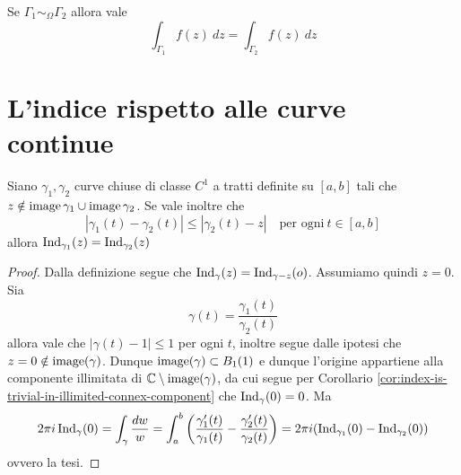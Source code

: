 \begin{corollary}
  Se $\Gamma_1 \sim_\Omega \Gamma_2$ allora vale
  \begin{equation*}
    \int_{\Gamma_1}f(z) \ dz = \int_{\Gamma_2 } f(z)\ dz
  \end{equation*}
  \label{cor:uguaglianza-catene-per-integrali}
\end{corollary}

\section{L'indice rispetto alle curve continue}

\begin{lemma}
    Siano $\gamma_1, \gamma_2$ curve chiuse di classe $C^1$ a tratti definite su
    $\left[ a,b \right]$ tali che $z \notin \operatorname{image}{\gamma_1} \cup
    \operatorname{image}{\gamma_2}$. Se vale inoltre che 
    \begin{equation*}
        |\gamma_1(t) - \gamma_2(t)| \le |\gamma_2(t) -z| \quad \text{per
        ogni}\ t \in \left[ a,b \right]
    \end{equation*}
    allora $\operatorname{Ind}_{\gamma_1}(z)
    = \operatorname{Ind}_{\gamma_2}(z)$
    \label{lem:stesso-indice-curve-vicine-in-punto}
\end{lemma}
\begin{proof}
 Dalla definizione segue che $\operatorname{Ind}_\gamma(z)
 = \operatorname{Ind}_{\gamma - z}(o)$. %
 Assumiamo quindi $z = 0$. Sia 
 \begin{equation*}
   \gamma(t) = \frac{\gamma_1(t)}{\gamma_2(t)}
 \end{equation*}
 allora vale che $|\gamma(t) - 1| \le 1$ per ogni $t$, inoltre segue dalle
 ipotesi che $z=0 \notin \operatorname{image}(\gamma)$. Dunque $\operatorname{image}(\gamma) \subset
 B_{1}(1)$ e dunque l'origine appartiene alla componente illimitata di $\mathbb{C}
 \setminus \operatorname{image}(\gamma)$, da cui segue per Corollario
 \ref{cor:index-is-trivial-in-illimited-connex-component} che
 $\operatorname{Ind}_\gamma(0) = 0$. Ma 
 \begin{equation*}
   2\pi i \operatorname{Ind}_\gamma(0) = \int_\gamma \frac{dw}{w} = \int_a^b
   \left( \frac{\gamma'_1(t)}{\gamma_1(t)}
   - \frac{\gamma'_2(t)}{\gamma_2(t)}\right) = 2\pi
   i (\operatorname{Ind}_{\gamma_1}(0) - \operatorname{Ind}_{\gamma_2}(0))
 \end{equation*}
 ovvero la tesi.
\end{proof}

